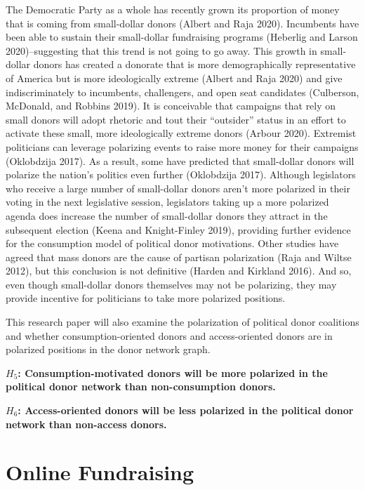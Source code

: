\documentclass[12pt,]{article}
\begin{document}
The Democratic Party as a whole has recently grown its proportion of
money that is coming from small-dollar donors (Albert and Raja 2020).
Incumbents have been able to sustain their small-dollar fundraising
programs (Heberlig and Larson 2020)--suggesting that this trend is not
going to go away. This growth in small-dollar donors has created a
donorate that is more demographically representative of America but is
more ideologically extreme (Albert and Raja 2020) and give
indiscriminately to incumbents, challengers, and open seat candidates
(Culberson, McDonald, and Robbins 2019). It is conceivable that
campaigns that rely on small donors will adopt rhetoric and tout their
``outsider'' status in an effort to activate these small, more
ideologically extreme donors (Arbour 2020). Extremist politicians can
leverage polarizing events to raise more money for their campaigns
(Oklobdzija 2017). As a result, some have predicted that small-dollar
donors will polarize the nation's politics even further (Oklobdzija
2017). Although legislators who receive a large number of small-dollar
donors aren't more polarized in their voting in the next legislative
session, legislators taking up a more polarized agenda does increase the
number of small-dollar donors they attract in the subsequent election
(Keena and Knight-Finley 2019), providing further evidence for the
consumption model of political donor motivations. Other studies have
agreed that mass donors are the cause of partisan polarization (Raja and
Wiltse 2012), but this conclusion is not definitive (Harden and Kirkland
2016). And so, even though small-dollar donors themselves may not be
polarizing, they may provide incentive for politicians to take more
polarized positions.

This research paper will also examine the polarization of political
donor coalitions and whether consumption-oriented donors and
access-oriented donors are in polarized positions in the donor network
graph.

\textbf{\(H_{5}\): Consumption-motivated donors will be more polarized
in the political donor network than non-consumption donors.}

\textbf{\(H_{6}\): Access-oriented donors will be less polarized in the
political donor network than non-access donors.}

\hypertarget{online-fundraising}{%
\section{Online Fundraising}\label{online-fundraising}}
\end{document}
